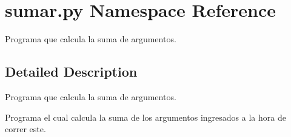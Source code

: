 \hypertarget{namespacesumar_1_1py}{}\section{sumar.\+py Namespace Reference}
\label{namespacesumar_1_1py}


Programa que calcula la suma de argumentos.  




\subsection{Detailed Description}
Programa que calcula la suma de argumentos. 

Programa el cual calcula la suma de los argumentos ingresados a la hora de correr este. 